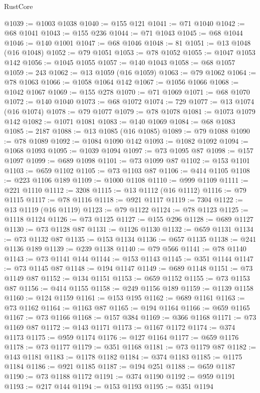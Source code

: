 \begin{lexlean}{RustCore}
\begin{coremodule}
@1039 := @1003 @1038
@1040 := @155 @121
@1041 := @71 @1040
@1042 := @68 @1041
@1043 := @155 @236
@1044 := @71 @1043
@1045 := @68 @1044
@1046 := @140 @1001
@1047 := @68 @1046
@1048 := 81
@1051 := @13 @1048 (@16 @1048)
@1052 := @79 @1051
@1053 := @78 @1052
@1055 := @1047 @1053 @142
@1056 := @1045 @1055
@1057 := @140 @1043
@1058 := @68 @1057
@1059 := 243
@1062 := @13 @1059 (@16 @1059)
@1063 := @79 @1062
@1064 := @78 @1063
@1066 := @1058 @1064 @142
@1067 := @1056 @1066
@1068 := @1042 @1067
@1069 := @155 @278
@1070 := @71 @1069
@1071 := @68 @1070
@1072 := @140 @1040
@1073 := @68 @1072
@1074 := 729
@1077 := @13 @1074 (@16 @1074)
@1078 := @79 @1077
@1079 := @78 @1078
@1081 := @1073 @1079 @142
@1082 := @1071 @1081
@1083 := @140 @1069
@1084 := @68 @1083
@1085 := 2187
@1088 := @13 @1085 (@16 @1085)
@1089 := @79 @1088
@1090 := @78 @1089
@1092 := @1084 @1090 @142
@1093 := @1082 @1092
@1094 := @1068 @1093
@1095 := @1039 @1094
@1097 := @73 @1095 @87
@1098 := @157 @1097
@1099 := @689 @1098
@1101 := @73 @1099 @87
@1102 := @153 @1101
@1103 := @659 @1102
@1105 := @73 @1103 @87
@1106 := @414 @1105
@1108 := @223 @1106 @189
@1109 := @1000 @1108
@1110 := @999 @1109
@1111 := @221 @1110
@1112 := 3208
@1115 := @13 @1112 (@16 @1112)
@1116 := @79 @1115
@1117 := @78 @1116
@1118 := @921 @1117
@1119 := 7304
@1122 := @13 @1119 (@16 @1119)
@1123 := @79 @1122
@1124 := @78 @1123
@1125 := @1118 @1124
@1126 := @73 @1125
@1127 := @155 @296
@1128 := @689 @1127
@1130 := @73 @1128 @87
@1131 := @1126 @1130
@1132 := @659 @1131
@1134 := @73 @1132 @87
@1135 := @153 @1134
@1136 := @657 @1135
@1138 := @241 @1136 @189
@1139 := @239 @1138
@1140 := @79 @566
@1141 := @78 @1140
@1143 := @73 @1141 @144
@1144 := @153 @1143
@1145 := @351 @1144
@1147 := @73 @1145 @87
@1148 := @194 @1147
@1149 := @689 @1148
@1151 := @73 @1149 @87
@1152 := @134 @1151
@1153 := @659 @1152
@1155 := @73 @1153 @87
@1156 := @414 @1155
@1158 := @249 @1156 @189
@1159 := @1139 @1158
@1160 := @124 @1159
@1161 := @153 @195
@1162 := @689 @1161
@1163 := @73 @1162
@1164 := @1163 @87
@1165 := @194 @1164
@1166 := @659 @1165
@1167 := @73 @1166
@1168 := @157 @384
@1169 := @366 @1168
@1171 := @73 @1169 @87
@1172 := @143 @1171
@1173 := @1167 @1172
@1174 := @374 @1173
@1175 := @959 @1174
@1176 := @127 @1164
@1177 := @659 @1176
@1178 := @73 @1177
@1179 := @351 @1168
@1181 := @73 @1179 @87
@1182 := @143 @1181
@1183 := @1178 @1182
@1184 := @374 @1183
@1185 := @1175 @1184
@1186 := @921 @1185
@1187 := @194 @251
@1188 := @659 @1187
@1190 := @73 @1188 @1172
@1191 := @374 @1190
@1192 := @959 @1191
@1193 := @217 @144
@1194 := @153 @1193
@1195 := @351 @1194

\end{coremodule}
\end{lexlean}
